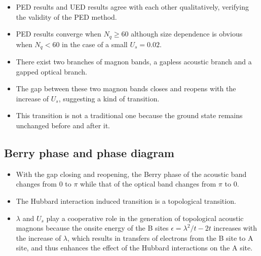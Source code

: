 \documentclass[a0,portrait]{a0poster}
\newcommand\myfigure[6]{%
  \ifdim#2>.8\linewidth
    {%
      \centering
      \texttt{[image: \#4]}%
      \captionof{figure}{#5}%
      \label{#6}%
    }%
  \else
  \begin{figure}
    \texttt{[image: \#4]}
    \caption{#5}
    \label{#6}%
  \end{figure}
  \fi
}
\begin{document}
\begin{multicols}{2}
\begin{multicols}{2}

\myfigure{L}{1.0\linewidth}{\linewidth}{spectrum.pdf}{Magnon bands calculated by PED (solid lines) and UED (red dots, $N_q=8$) with (a) $U_s=0.02$, (b) $U_s=0.40$, (c) $U_s$=0.78. Other parameters are fixed at $t=1.0$, $\lambda=1.4$, $U_d=1.0$. The inset in (a) shows the magnon bands calculated by PED with $N_q=800$ around $q=\pi$, where the gap between the acoustic band and optical band is obvious.}{spectrum}

\begin{itemize}
  \item PED results and UED results agree with each other qualitatively, verifying the validity of the PED method.
  \item PED results converge when  $N_q\ge60$ although size dependence is obvious when $N_q<60$ in the case of a small $U_s=0.02$.
  \item There exist two branches of magnon bands, a gapless acoustic branch and a gapped optical branch.
  \item The gap between these two magnon bands closes and reopens with the increase of $U_s$, suggesting a kind of transition.
  \item This transition is not a traditional one because the ground state remains unchanged before and after it.
\end{itemize}
\end{multicols}

\subsection*{Berry phase and phase diagram}

\begin{multicols}{2}

\myfigure{L}{1.0\linewidth}{\linewidth}{gap_berry_and_phase_diagram.pdf}{(a) The blue line is the magnitude of the gap between the acoustic and optical band at $q=\pi$ with $N_q=800$. The green solid/dashed line represents the corresponding Berry phase of the acoustic/optical band. Other parameters are fixed at $t=1.0$, $\lambda=1.4$, $U_d=1.0$. (b) Phase diagram of Eq. (\ref{model}). The dotted line marks the parameters used in Fig.\ref{gap}(a) and in Fig.\ref{edge}(a).}{gap}
\begin{itemize}
  \item With the gap closing and reopening, the Berry phase of the acoustic band changes from $0$ to $\pi$ while that of the optical band changes from $\pi$ to $0$.
  \item The Hubbard interaction induced transition is a topological transition.
  \item $\lambda$ and $U_s$ play a cooperative role in the generation of topological acoustic magnons because the onsite energy of the B sites $\epsilon=\lambda^2/t-2t$ increases with the increase of $\lambda$, which results in transfers of electrons from the B site to A site, and thus enhances the effect of the Hubbard interactions on the A site.
\end{itemize}


\end{multicols}
\end{multicols}
\end{document}
